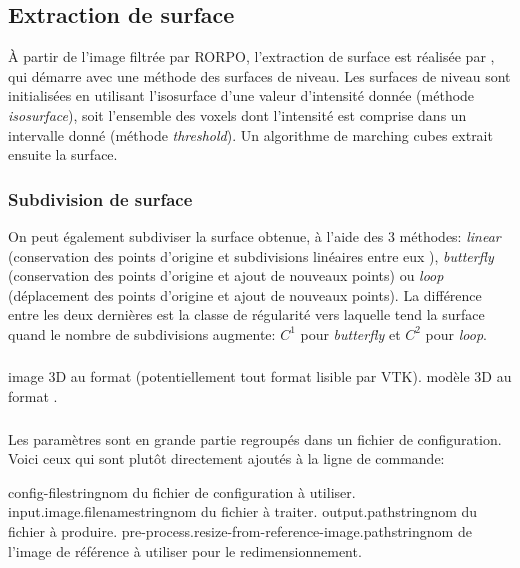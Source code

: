 	\subsection{Extraction de surface}
	\label{brique:sfi}

À partir de l'image filtrée par RORPO, l'extraction de surface est réalisée par , qui démarre avec une méthode des surfaces de niveau. Les surfaces de niveau sont initialisées en utilisant l'isosurface d'une valeur d'intensité donnée (méthode \textit{isosurface}), soit l'ensemble des voxels dont l'intensité est comprise dans un intervalle donné (méthode \textit{threshold}). Un algorithme de marching cubes extrait ensuite la surface. 


	\subsubsection{Subdivision de surface}
	
	On peut également subdiviser la surface obtenue, à l'aide des 3 méthodes: \textit{linear} (conservation des points d'origine et subdivisions linéaires entre eux \tbv), \textit{butterfly} (conservation des points d'origine et ajout de nouveaux points) ou \textit{loop} (déplacement des points d'origine et ajout de nouveaux points). La différence entre les deux dernières est la classe de régularité vers laquelle tend la surface quand le nombre de subdivisions augmente: $C^1$ pour \textit{butterfly} et $C^2$ pour \textit{loop}.

	\subsubsection{\ioT}

\iolist
{image 3D au format \mha (potentiellement tout format lisible par VTK).}
{modèle 3D au format \stl.}

	\subsubsection{\argsT}

Les paramètres sont en grande partie regroupés dans un fichier de configuration. Voici ceux qui sont plutôt directement ajoutés à la ligne de commande:

\args
{config-file}{}{string}{nom du fichier de configuration à utiliser.}
{input.image.filename}{}{string}{nom du fichier à traiter.}
{output.path}{}{string}{nom du fichier à produire.}
{pre-process.resize-from-reference-image.path}{}{string}{nom de l'image de référence à utiliser pour le redimensionnement.}
\stoparg

